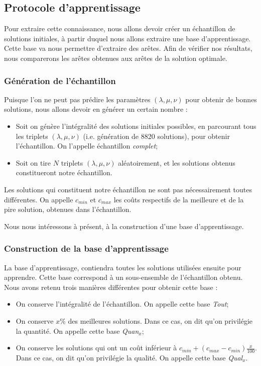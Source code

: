 \documentclass[a4paper,11pt]{article}%
\begin{document}
\subsection{Protocole d'apprentissage}
Pour extraire cette connaissance, nous allons devoir créer un échantillon de solutions initiales, à partir duquel nous allons extraire une base d'apprentissage. Cette base va nous permettre d'extraire des arêtes. Afin de vérifier nos résultats, nous comparerons les arêtes obtenues aux arêtes de la solution optimale.

\subsubsection{Génération de l'échantillon}
Puisque l'on ne peut pas prédire les paramètres $(\lambda,\mu,\nu)$ pour obtenir de bonnes solutions, nous allons devoir en générer un certain nombre :

\begin{itemize}
\item Soit on génère l'intégralité des solutions initiales possibles, en parcourant tous les triplets $(\lambda,\mu,\nu)$ (i.e. génération de 8820 solutions), pour obtenir l'échantillon. On l'appelle échantillon \emph{complet};
\item Soit on tire $N$ triplets $(\lambda,\mu,\nu)$ aléatoirement, et les solutions obtenus constitueront notre échantillon. 
\end{itemize}

Les solutions qui constituent notre échantillon ne sont pas nécessairement toutes différentes.
On appelle $c_{min}$ et $c_{max}$ les coûts respectifs de la meilleure et de la pire solution, obtenues dans l'échantillon. 

Nous nous intéressons à présent, à la construction d'une base d'apprentissage.

\subsubsection{Construction de la base d'apprentissage}
La base d'apprentissage, contiendra toutes les solutions utilisées ensuite pour apprendre. Cette base correspond à un sous-ensemble de l'échantillon obtenu. 
Nous avons retenu trois manières différentes pour obtenir cette base :

\begin{itemize}
\item On conserve l'intégralité de l'échantillon. On appelle cette base \emph{Tout};
\item On conserve $x\%$ des meilleures solutions. Dans ce cas, on dit qu'on privilégie la quantité. On appelle cette base \emph{Quan$_x$};
\item On conserve les solutions qui ont un coût inférieur à $c_{min} + (c_{max}-c_{min})\frac{x}{100}$. Dans ce cas, on dit qu'on privilégie la qualité. On appelle cette base \emph{Qual$_x$}.
\end{itemize}
\end{document}
